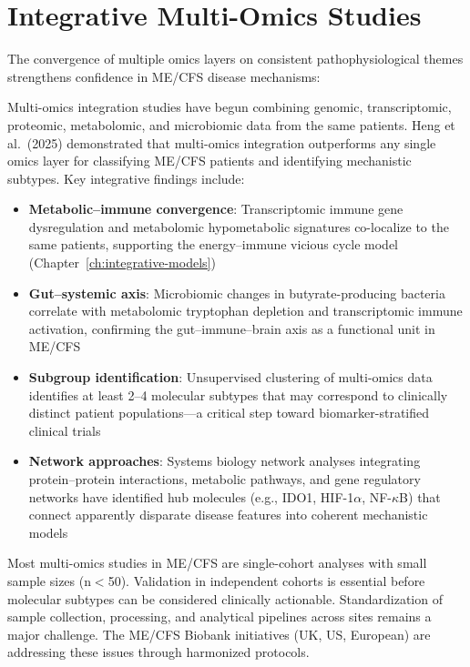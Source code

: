\section{Integrative Multi-Omics Studies}
\label{sec:multi-omics-integration}

The convergence of multiple omics layers on consistent pathophysiological themes strengthens confidence in ME/CFS disease mechanisms:

Multi-omics integration studies have begun combining genomic, transcriptomic, proteomic, metabolomic, and microbiomic data from the same patients. Heng et al.\ (2025) demonstrated that multi-omics integration outperforms any single omics layer for classifying ME/CFS patients and identifying mechanistic subtypes. Key integrative findings include:

\begin{itemize}
    \item \textbf{Metabolic--immune convergence}: Transcriptomic immune gene dysregulation and metabolomic hypometabolic signatures co-localize to the same patients, supporting the energy--immune vicious cycle model (Chapter~\ref{ch:integrative-models})
    \item \textbf{Gut--systemic axis}: Microbiomic changes in butyrate-producing bacteria correlate with metabolomic tryptophan depletion and transcriptomic immune activation, confirming the gut--immune--brain axis as a functional unit in ME/CFS
    \item \textbf{Subgroup identification}: Unsupervised clustering of multi-omics data identifies at least 2--4 molecular subtypes that may correspond to clinically distinct patient populations---a critical step toward biomarker-stratified clinical trials
    \item \textbf{Network approaches}: Systems biology network analyses integrating protein--protein interactions, metabolic pathways, and gene regulatory networks have identified hub molecules (e.g., IDO1, HIF-1$\alpha$, NF-$\kappa$B) that connect apparently disparate disease features into coherent mechanistic models
\end{itemize}

\begin{limitation}
Most multi-omics studies in ME/CFS are single-cohort analyses with small sample sizes (n$<$50). Validation in independent cohorts is essential before molecular subtypes can be considered clinically actionable. Standardization of sample collection, processing, and analytical pipelines across sites remains a major challenge. The ME/CFS Biobank initiatives (UK, US, European) are addressing these issues through harmonized protocols.
\end{limitation}

